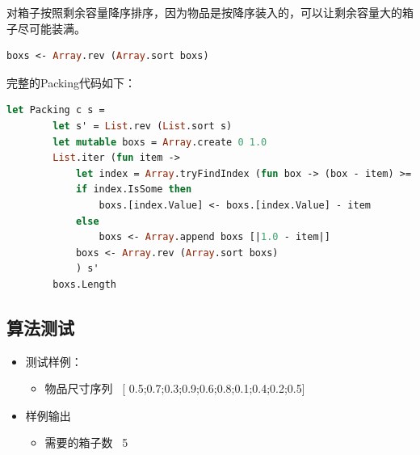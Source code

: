 \documentclass[a4paper]{article}
\begin{document}
对箱子按照剩余容量降序排序，因为物品是按降序装入的，可以让剩余容量大的箱子尽可能装满。

\begin{lstlisting}[language=ML]
            boxs <- Array.rev (Array.sort boxs)
\end{lstlisting}

完整的Packing代码如下：

\begin{lstlisting}[language=ML]
    let Packing c s =
        let s' = List.rev (List.sort s)
        let mutable boxs = Array.create 0 1.0
        List.iter (fun item -> 
            let index = Array.tryFindIndex (fun box -> (box - item) >= -0.000001 ) boxs
            if index.IsSome then
                boxs.[index.Value] <- boxs.[index.Value] - item
            else
                boxs <- Array.append boxs [|1.0 - item|]
            boxs <- Array.rev (Array.sort boxs)
            ) s'
        boxs.Length
\end{lstlisting}

\subsection{算法测试}

\begin{itemize}
\item
    测试样例：
    \begin{itemize}
    \item
        物品尺寸序列 \ [ 0.5;0.7;0.3;0.9;0.6;0.8;0.1;0.4;0.2;0.5] 
    \end{itemize}
\item
    样例输出
    \begin{itemize}
    \item
        需要的箱子数 \ 5
    \end{itemize}
\end{itemize}
\end{document}

